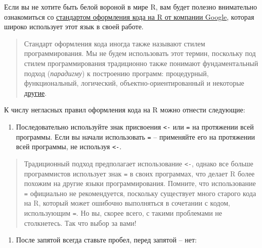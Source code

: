 \documentclass[]{book}
\providecommand{\tightlist}{%
  \setlength{\itemsep}{0pt}\setlength{\parskip}{0pt}}
\begin{document}
Если вы не хотите быть белой вороной в мире R, вам будет полезно
внимательно ознакомиться со
\href{https://google.github.io/styleguide/Rguide.xml\#filenames}{стандартом
оформления кода на R от компании Google}, которая широко использует этот
язык в своей работе.

\begin{quote}
Стандарт оформления кода иногда также называют стилем программирования.
Мы не будем использовать этот термин, поскольку под стилем
программирования традиционно также понимают фундаментальный подход
(\emph{парадигму}) к построению программ: процедурный, функциональный,
логический, объектно-ориентированный и некоторые
\href{https://ru.wikipedia.org/wiki/Парадигма_программирования}{другие}.
\end{quote}

К числу негласных правил оформления кода на R можно отнести следующие:

\begin{enumerate}
\def\labelenumi{\arabic{enumi}.}
\tightlist
\item
  Последовательно используйте знак присвоения \texttt{\textless{}-} или
  \texttt{=} на протяжении всей программы. Если вы начали использовать
  \texttt{=} -- применяйте его на протяжении всей программы, не
  используя \texttt{\textless{}-}.
\end{enumerate}

\begin{quote}
Традиционный подход предполагает использование \texttt{\textless{}-},
однако все больше программистов использует знак \texttt{=} в своих
программах, что делает R более похожим на другие языки программирования.
Помните, что использование \texttt{=} официально не рекомендуется,
поскольку существует много старого кода на R, который может ошибочно
выполняться в сочетании с кодом, использующим \texttt{=}. Но вы, скорее
всего, с такими проблемами не столкнетесь. Так что выбор за вами!
\end{quote}

\begin{enumerate}
\def\labelenumi{\arabic{enumi}.}
\setcounter{enumi}{1}
\tightlist
\item
  После запятой всегда ставьте пробел, перед запятой -- нет:
\end{enumerate}
\end{document}

